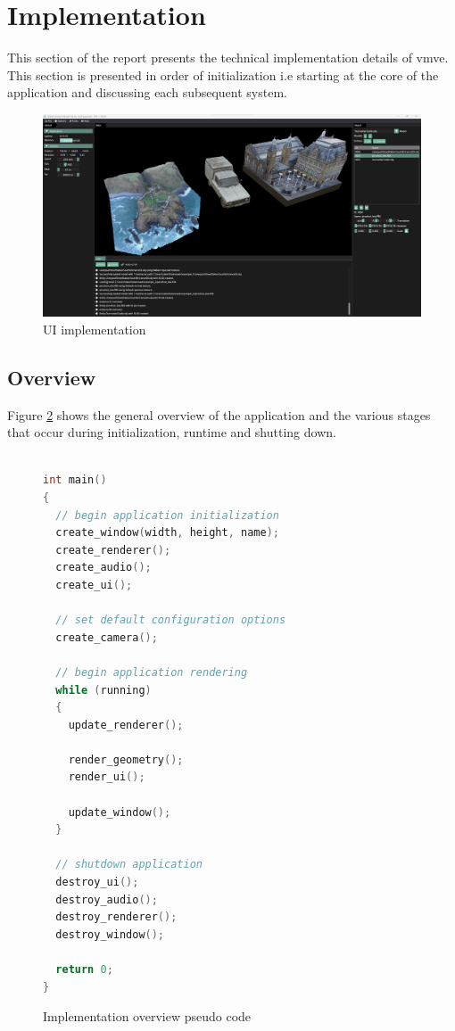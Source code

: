 \documentclass[11pt]{article}
\begin{document}
\clearpage
\section{Implementation}
This section of the report presents the technical implementation details of
\gls*{vmve}. This section is presented in order of initialization i.e starting at
the core of the application and discussing each subsequent system.

\begin{figure}[H]
  \centering
  \includegraphics[width=\textwidth]{images/ui_implementation.png}
  \caption{UI implementation}
  \label{fig:user_interface}
\end{figure}



\subsection{Overview}
Figure \ref{fig:overview_pseudo_code} shows the general overview of the application and the various 
stages that occur during initialization, runtime and shutting down.


\begin{figure}[H]
\centering
\begin{lstlisting}[language=C++]

int main()
{
  // begin application initialization
  create_window(width, height, name);
  create_renderer();
  create_audio();
  create_ui();

  // set default configuration options
  create_camera();
  
  // begin application rendering
  while (running)
  {
    update_renderer();

    render_geometry();
    render_ui();

    update_window();
  }

  // shutdown application
  destroy_ui();
  destroy_audio();
  destroy_renderer();
  destroy_window();

  return 0;
}
\end{lstlisting}
\caption{Implementation overview pseudo code}
\label{fig:overview_pseudo_code}
\end{figure}
\end{document}

